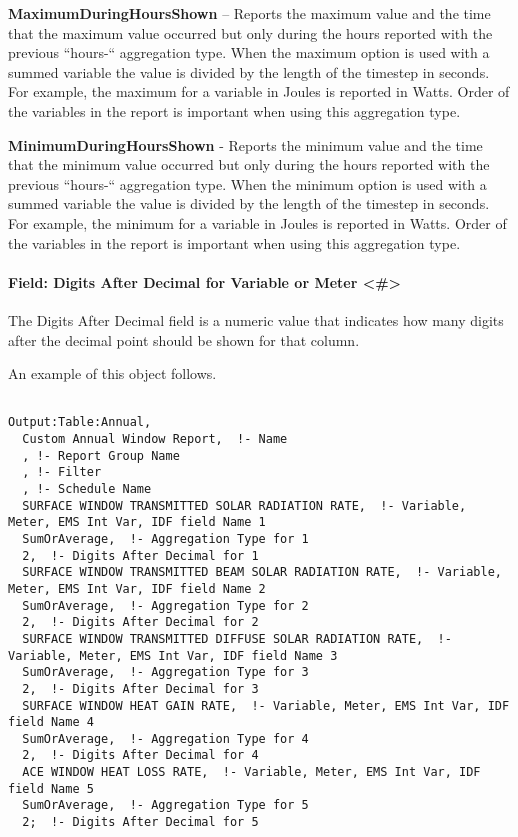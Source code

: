 \textbf{MaximumDuringHoursShown} -- Reports the maximum value and the time that the maximum value occurred but only during the hours reported with the previous ``hours-`` aggregation type. When the maximum option is used with a summed variable the value is divided by the length of the timestep in seconds. For example, the maximum for a variable in Joules is reported in Watts. Order of the variables in the report is important when using this aggregation type.

\textbf{MinimumDuringHoursShown} - Reports the minimum value and the time that the minimum value occurred but only during the hours reported with the previous ``hours-`` aggregation type. When the minimum option is used with a summed variable the value is divided by the length of the timestep in seconds. For example, the minimum for a variable in Joules is reported in Watts. Order of the variables in the report is important when using this aggregation type.

\paragraph{Field: Digits After Decimal for Variable or Meter \textless{}\#\textgreater{}}\label{field-digits-after-decimal-for-variable-or-meter}

The Digits After Decimal field is a numeric value that indicates how many digits after the decimal point should be shown for that column.

An example of this object follows.

\begin{lstlisting}

Output:Table:Annual,
  Custom Annual Window Report,  !- Name
  , !- Report Group Name
  , !- Filter
  , !- Schedule Name
  SURFACE WINDOW TRANSMITTED SOLAR RADIATION RATE,  !- Variable, Meter, EMS Int Var, IDF field Name 1
  SumOrAverage,  !- Aggregation Type for 1
  2,  !- Digits After Decimal for 1
  SURFACE WINDOW TRANSMITTED BEAM SOLAR RADIATION RATE,  !- Variable, Meter, EMS Int Var, IDF field Name 2
  SumOrAverage,  !- Aggregation Type for 2
  2,  !- Digits After Decimal for 2
  SURFACE WINDOW TRANSMITTED DIFFUSE SOLAR RADIATION RATE,  !- Variable, Meter, EMS Int Var, IDF field Name 3
  SumOrAverage,  !- Aggregation Type for 3
  2,  !- Digits After Decimal for 3
  SURFACE WINDOW HEAT GAIN RATE,  !- Variable, Meter, EMS Int Var, IDF field Name 4
  SumOrAverage,  !- Aggregation Type for 4
  2,  !- Digits After Decimal for 4
  ACE WINDOW HEAT LOSS RATE,  !- Variable, Meter, EMS Int Var, IDF field Name 5
  SumOrAverage,  !- Aggregation Type for 5
  2;  !- Digits After Decimal for 5
\end{lstlisting}